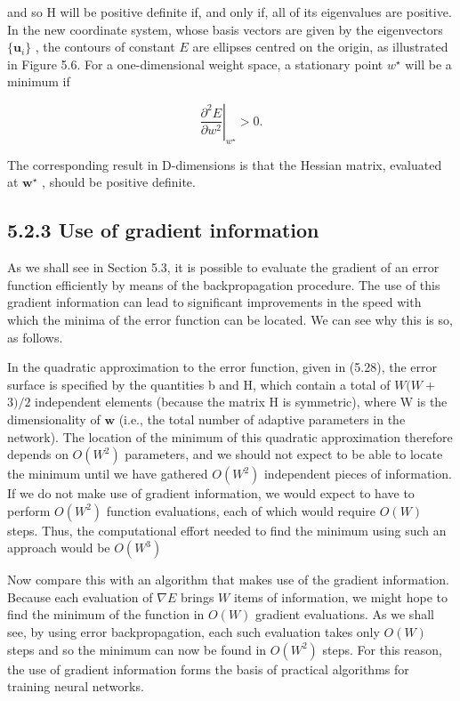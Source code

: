 \documentclass[
  10
]{article}
\begin{document}
and so H will be positive definite if, and only if, all of its
eigenvalues are positive. In the new coordinate system, whose basis
vectors are given by the eigenvectors \(\{ \mathbf { u } _ { i } \}\) ,
the contours of constant \(E\) are ellipses centred on the origin, as
illustrated in Figure 5.6. For a one-dimensional weight space, a
stationary point \(w ^ { \star }\) will be a minimum if

\[
\left. \frac {\partial^ {2} E}{\partial w ^ {2}} \right| _ {w ^ {\star}} > 0.\tag{5.40}
\]

The corresponding result in D-dimensions is that the Hessian matrix,
evaluated at \(\mathbf { w } ^ { \star }\) , should be positive
definite.

\subsection{5.2.3 Use of gradient
information}\label{use-of-gradient-information}

As we shall see in Section 5.3, it is possible to evaluate the gradient
of an error function efficiently by means of the backpropagation
procedure. The use of this gradient information can lead to significant
improvements in the speed with which the minima of the error function
can be located. We can see why this is so, as follows.

In the quadratic approximation to the error function, given in (5.28),
the error surface is specified by the quantities b and H, which contain
a total of \(W ( W +\) \(3 ) / 2\) independent elements (because the
matrix H is symmetric), where W is the dimensionality of
\(\mathbf { w }\) (i.e., the total number of adaptive parameters in the
network). The location of the minimum of this quadratic approximation
therefore depends on \(O ( W ^ { 2 } )\) parameters, and we should not
expect to be able to locate the minimum until we have gathered
\(O ( W ^ { 2 } )\) independent pieces of information. If we do not make
use of gradient information, we would expect to have to perform
\(O ( W ^ { 2 } )\) function evaluations, each of which would require
\(O ( W )\) steps. Thus, the computational effort needed to find the
minimum using such an approach would be \(O ( W ^ { 3 } )\)

Now compare this with an algorithm that makes use of the gradient
information. Because each evaluation of \(\nabla E\) brings \(W\) items
of information, we might hope to find the minimum of the function in
\(O ( W )\) gradient evaluations. As we shall see, by using error
backpropagation, each such evaluation takes only \(O ( W )\) steps and
so the minimum can now be found in \(O ( W ^ { 2 } )\) steps. For this
reason, the use of gradient information forms the basis of practical
algorithms for training neural networks.
\end{document}
